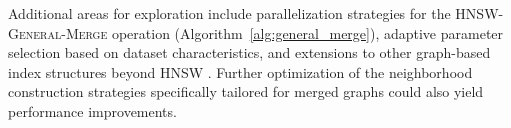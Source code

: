 \documentclass{article}
\begin{document}
Additional areas for exploration include parallelization strategies for the \textsc{HNSW-General-Merge} operation (Algorithm~\ref{alg:general_merge}), adaptive parameter selection based on dataset characteristics, and extensions to other graph-based index structures beyond HNSW \cite{hnsw}. Further optimization of the neighborhood construction strategies specifically tailored for merged graphs could also yield performance improvements.






\end{document}
